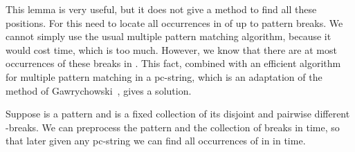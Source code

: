\documentclass[runningheads]{llncs}
\begin{document}
This lemma is very useful, but it does not give a method to find all these  positions. For this need to locate all occurrences in  of up to  pattern breaks. We cannot simply use the usual multiple pattern matching algorithm, because it would cost  time, which is too much. However, we know that there are at most  occurrences of these breaks in . This fact, combined with an efficient algorithm for multiple pattern matching in a pc-string, which is an adaptation
of the method of Gawrychowski~\cite{GawrychowskiMultipleLZW}, gives a solution.


\begin{lemma}\label{lemma:break_matching}
Suppose  is a pattern and  is a fixed collection of its disjoint and pairwise different -breaks. We can preprocess the pattern and the collection of breaks
in  time, so that later given any pc-string  we can find all  occurrences of  in  in  time.
\end{lemma}
\end{document}
